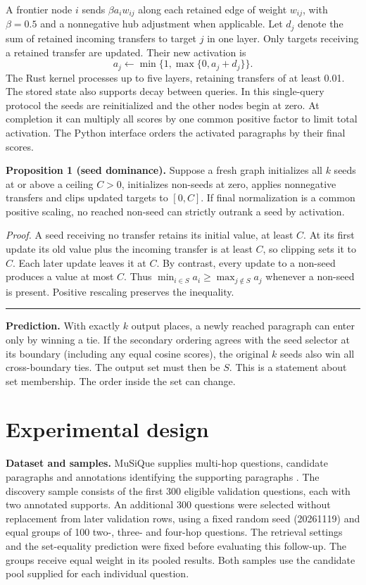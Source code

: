 \documentclass[11pt,a4paper]{article}
\begin{document}
A frontier node $i$ sends $\beta a_i w_{ij}$ along each retained edge of weight $w_{ij}$, with $\beta=0.5$ and a nonnegative hub adjustment when applicable. Let $d_j$ denote the sum of retained incoming transfers to target $j$ in one layer. Only targets receiving a retained transfer are updated. Their new activation is
\begin{equation}
a_j \leftarrow \min\{1,\max\{0,a_j+d_j\}\}.
\label{eq:clip}
\end{equation}
The Rust kernel processes up to five layers, retaining transfers of at least 0.01. The stored state also supports decay between queries. In this single-query protocol the seeds are reinitialized and the other nodes begin at zero. At completion it can multiply all scores by one common positive factor to limit total activation. The Python interface orders the activated paragraphs by their final scores.

\textbf{Proposition 1 (seed dominance).} Suppose a fresh graph initializes all $k$ seeds at or above a ceiling $C>0$, initializes non-seeds at zero, applies nonnegative transfers and clips updated targets to $[0,C]$. If final normalization is a common positive scaling, no reached non-seed can strictly outrank a seed by activation.

\textit{Proof.} A seed receiving no transfer retains its initial value, at least $C$. At its first update its old value plus the incoming transfer is at least $C$, so clipping sets it to $C$. Each later update leaves it at $C$. By contrast, every update to a non-seed produces a value at most $C$. Thus $\min_{i\in S}a_i\geq\max_{j\notin S}a_j$ whenever a non-seed is present. Positive rescaling preserves the inequality. \hfill\rule{5pt}{5pt}

\textbf{Prediction.} With exactly $k$ output places, a newly reached paragraph can enter only by winning a tie. If the secondary ordering agrees with the seed selector at its boundary (including any equal cosine scores), the original $k$ seeds also win all cross-boundary ties. The output set must then be $S$. This is a statement about set membership. The order inside the set can change.

\newpage
\section{Experimental design}
\textbf{Dataset and samples.} MuSiQue supplies multi-hop questions, candidate paragraphs and annotations identifying the supporting paragraphs \cite{musique}. The discovery sample consists of the first 300 eligible validation questions, each with two annotated supports. An additional 300 questions were selected without replacement from later validation rows, using a fixed random seed (20261119) and equal groups of 100 two-, three- and four-hop questions. The retrieval settings and the set-equality prediction were fixed before evaluating this follow-up. The groups receive equal weight in its pooled results. Both samples use the candidate pool supplied for each individual question.
\end{document}

